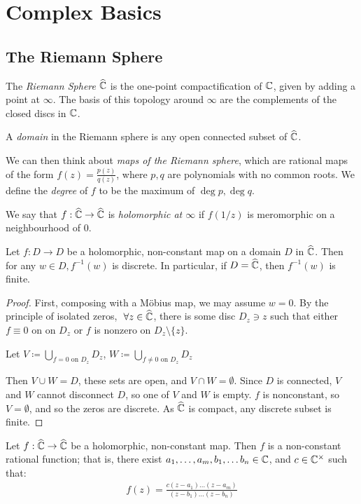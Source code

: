 \documentclass[10pt,a4paper]{article}
\begin{document}
\section{Complex Basics}
\subsection{The Riemann Sphere}
The \emph{Riemann Sphere} $\widehat{\mathbb{C}}$ is the one-point compactification of $\mathbb{C}$, given by adding a point at $\infty$. The basis of this topology around $\infty$ are the complements of the closed discs in $\mathbb{C}$.

\begin{definition}
A \emph{domain} in the Riemann sphere is any open connected subset of $\widehat{\mathbb{C}}$.
\end{definition}
We can then think about \emph{maps of the Riemann sphere}, which are rational maps of the form $f(z) = \frac{p(z)}{q(z)}$, where $p, q$ are polynomials with no common roots. We define the \emph{degree} of $f$ to be the maximum of $\deg p, \deg q$.

\begin{definition}
We say that $f : \widehat{\mathbb{C}} \to \widehat{\mathbb{C}}$ is \emph{holomorphic at $\infty$} if $f(1/z)$ is meromorphic on a neighbourhood of 0.
\end{definition}

\begin{lemma}
Let $f: D \to D$ be a holomorphic, non-constant map on a domain $D$ in $\widehat{\mathbb{C}}$. Then for any $w \in D, f^{-1}(w)$ is discrete. In particular, if $D = \widehat{\mathbb{C}}$, then $f^{-1}(w)$ is finite.
\end{lemma}
\begin{proof}
First, composing with a M\"obius map, we may assume $w = 0$. By the principle of isolated zeros, $\forall z \in \hat{\C}$, there is some disc $D_z \ni z$ such that either $f \equiv 0$ on  on $D_z$ or $f$ is nonzero on $D_z \setminus \{z\}$.

Let $V \coloneqq \bigcup_{f = 0 \text{ on } D_z} D_z$, $W \coloneqq \bigcup_{f \neq 0 \text{ on } D_z} D_z$

Then $V \cup W = D$, these sets are open, and $V \cap W = \emptyset$. Since $D$ is connected, $V$ and $W$ cannot disconnect $D$, so one of $V$ and $W$ is empty. $f$ is nonconstant, so $V = \emptyset$, and so the zeros are discrete. As $\widehat{\mathbb{C}}$ is compact, any discrete subset is finite.
\end{proof}

\begin{proposition}
Let $f: \widehat{\mathbb{C}} \to \widehat{\mathbb{C}}$ be a holomorphic, non-constant map. Then $f$ is a non-constant rational function; that is, there exist $a_1, \ldots, a_m, b_1, \ldots b_n \in \mathbb{C}$, and $c \in \mathbb{C}^{\times}$ such that:
\begin{align*}
f(z) = \frac{c(z-a_1)\ldots(z-a_m)}{(z-b_1)\ldots(z-b_n)}
\end{align*}
\end{proposition}
\end{document}
